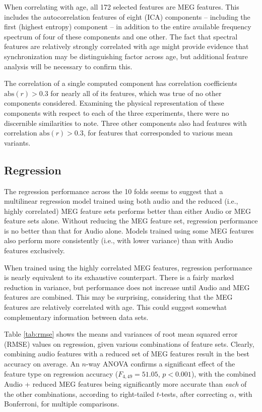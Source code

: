 \documentclass[a4paper]{article}
\begin{document}
When correlating with age, all 172 selected features are MEG features. This includes the autocorrelation features of eight (ICA) components -- including the first (highest entropy) component -- in addition to the entire available frequency spectrum of four of these components and one other. The fact that spectral features are relatively strongly correlated with age might provide evidence that synchronization may be distinguishing factor across age, but additional feature analysis will be necessary to confirm this. 

The correlation of a single computed component has correlation coefficients $\text{abs}(r)>0.3$ for nearly all of its features, which was true of no other components considered. Examining the physical representation of these components with respect to each of the three experiments, there were no discernible similarities to note. Three other components also had features with correlation $\text{abs}(r)>0.3$, for features that corresponded to various mean variants.

\subsection{Regression}

The regression performance across the 10 folds seems to suggest that a multilinear regression model trained using both audio and the reduced (i.e., highly correlated) MEG feature sets performs better than either Audio or MEG feature sets alone. Without  reducing the MEG feature set, regression performance is no better than that for Audio alone. Models trained using some MEG features also  perform more consistently (i.e., with lower variance) than with Audio features exclusively.

When trained using the highly correlated MEG features, regression performance is nearly equivalent to its exhaustive counterpart. There is a fairly marked reduction in variance, but performance does not increase until Audio and MEG features are combined. This may be surprising, considering that the MEG features are relatively correlated with age. This could suggest somewhat complementary information between data sets. %

Table \ref{tab:rmse} shows the means and variances of root mean squared error (RMSE) values on regression, given various combinations of feature sets. Clearly, combining audio features with a reduced set of MEG features result in the best accuracy on average. An $n$-way ANOVA confirms a significant effect of the feature type on regression accuracy ($F_{4,49} = 51.05$, $p<0.001$), with the combined Audio + reduced MEG features being significantly more accurate than {\em each} of the other combinations, according to right-tailed $t$-tests, after correcting $\alpha$, with Bonferroni, for multiple comparisons. 
\end{document}
